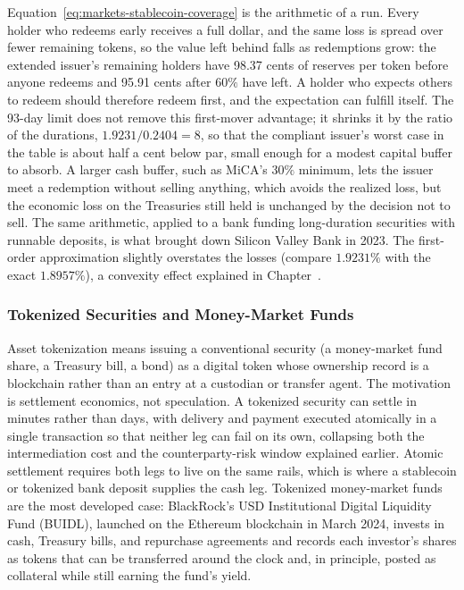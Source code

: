 \documentclass[../ai_in_finance]{subfiles}
\begin{document}
Equation~\eqref{eq:markets-stablecoin-coverage} is the arithmetic of a run. Every holder who redeems early receives a full dollar, and the same loss is spread over fewer remaining tokens, so the value left behind falls as redemptions grow: the extended issuer's remaining holders have 98.37 cents of reserves per token before anyone redeems and 95.91 cents after $60\%$ have left. A holder who expects others to redeem should therefore redeem first, and the expectation can fulfill itself. The 93-day limit does not remove this first-mover advantage; it shrinks it by the ratio of the durations, $1.9231/0.2404 = 8$, so that the compliant issuer's worst case in the table is about half a cent below par, small enough for a modest capital buffer to absorb. A larger cash buffer, such as MiCA's $30\%$ minimum, lets the issuer meet a redemption without selling anything, which avoids the realized loss, but the economic loss on the Treasuries still held is unchanged by the decision not to sell. The same arithmetic, applied to a bank funding long-duration securities with runnable deposits, is what brought down Silicon Valley Bank in 2023. The first-order approximation slightly overstates the losses (compare $1.9231\%$ with the exact $1.8957\%$), a convexity effect explained in Chapter~.

\subsubsection*{Tokenized Securities and Money-Market Funds}

Asset tokenization means issuing a conventional security (a money-market fund share, a Treasury bill, a bond) as a digital token whose ownership record is a blockchain rather than an entry at a custodian or transfer agent. The motivation is settlement economics, not speculation. A tokenized security can settle in minutes rather than days, with delivery and payment executed atomically in a single transaction so that neither leg can fail on its own, collapsing both the intermediation cost and the counterparty-risk window explained earlier. Atomic settlement requires both legs to live on the same rails, which is where a stablecoin or tokenized bank deposit supplies the cash leg. Tokenized money-market funds are the most developed case: BlackRock's USD Institutional Digital Liquidity Fund (BUIDL), launched on the Ethereum blockchain in March 2024, invests in cash, Treasury bills, and repurchase agreements and records each investor's shares as tokens that can be transferred around the clock and, in principle, posted as collateral while still earning the fund's yield.
\end{document}
